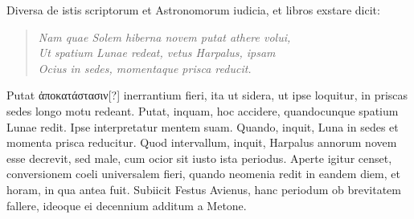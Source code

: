 Diversa de istis scriptorum et Astronomorum iudicia, et libros exstare
dicit:
\begin{quote}
  \emph{Nam quae Solem hiberna novem putat athere volui,\\
  Ut spatium Lunae redeat, vetus Harpalus, ipsam\\
  Ocius in sedes, momentaque prisca reducit.}
\end{quote}
Putat \textgreek{ἀποκατάστασιν[?]} inerrantium fieri, ita ut sidera,
 ut ipse loquitur, in
priscas sedes longo motu redeant.
Putat, inquam, hoc accidere, quandocunque
spatium Lunae redit.
Ipse interpretatur mentem suam.
Quando, inquit, Luna in sedes et momenta prisca reducitur.
Quod
intervallum, inquit, Harpalus annorum novem esse decrevit, sed
male, cum ocior sit iusto ista periodus.
Aperte igitur censet, conversionem
coeli universalem fieri, quando neomenia redit in eandem
diem, et horam, in qua antea fuit.
Subiicit Festus Avienus, hanc periodum
ob brevitatem fallere, ideoque ei decennium additum a
Metone.

